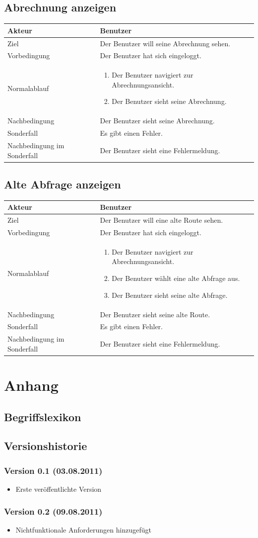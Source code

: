 \documentclass[a4paper,10pt,titlepage]{article}
\newcommand{\usecase}[8]
{\subsection{#1}
\begin{tabular}{|p{0.2\textwidth}|p{0.7\textwidth}|}
\hline
  Akteur & #2\\\hline
  Ziel & #3\\\hline
  Vorbedingung & #4\\\hline
  Normalablauf & #7\\\hline
  Nachbedingung & #5\\\hline
  Sonderfall & #8\\\hline
  Nachbedingung im Sonderfall& #6\\\hline
 \end{tabular}
}
\newcommand{\begriff}[7]
{\subsection{#1}
\begin{tabular}{|p{0.2\textwidth}|p{0.7\textwidth}|}
\hline
  Bedeutung & #2\\\hline
  Abgrenzung & #3\\\hline
  Gültigkeit & #4\\\hline
  Bezeichnung & #5\\\hline
  Unklarheiten & #6\\\hline
  Querverweise & #7\\\hline
 \end{tabular}}
\begin{document}
\usecase{Abrechnung anzeigen}
{Benutzer}{Der Benutzer will seine Abrechnung sehen.}{Der Benutzer hat sich eingeloggt.}{Der Benutzer sieht seine Abrechnung.}{Der Benutzer sieht eine Fehlermeldung.}{
\begin{enumerate}
\item Der Benutzer navigiert zur Abrechnungsansicht.
\item Der Benutzer sieht seine Abrechnung.
\end{enumerate}
}{Es gibt einen Fehler.}

\usecase{Alte Abfrage anzeigen}
{Benutzer}{Der Benutzer will eine alte Route sehen.}{Der Benutzer hat sich eingeloggt.}{Der Benutzer sieht seine alte Route.}{Der Benutzer sieht eine Fehlermeldung.}{
\begin{enumerate}
\item Der Benutzer navigiert zur Abrechnungsansicht.
\item Der Benutzer wählt eine alte Abfrage aus.
\item Der Benutzer sieht seine alte Abfrage.
\end{enumerate}
}{Es gibt einen Fehler.}

\clearpage
\appendix
\section{Anhang}

\subsection{Begriffslexikon}


\clearpage
\subsection{Versionshistorie}

	\subsubsection*{Version 0.1 (03.08.2011)}
	\begin{itemize}
		\item Erste veröffentlichte Version
	\end{itemize}

	\subsubsection*{Version 0.2 (09.08.2011)}
	\begin{itemize}
		\item Nichtfunktionale Anforderungen hinzugefügt
	\end{itemize}
\end{document}
